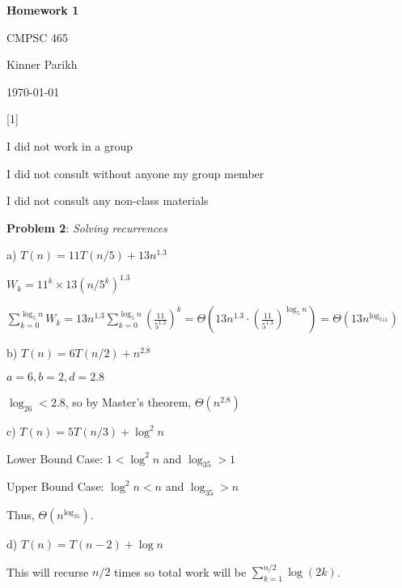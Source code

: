 \documentclass{article} %
\newcommand{\question}[2][]{\begin{flushleft}
        \textbf{Problem #1}: \textit{#2}

\end{flushleft}}
\newcommand{\maketitletwo}[2][]{\begin{center}
        \Large{\textbf{Homework #1}
            
            CMPSC 465} %
        \vspace{5pt}
        
        \normalsize{Kinner Parikh  %
        
        \today}        %
        \vspace{40pt}


        \newpage
        
\end{center}}
\begin{document}
    \maketitletwo[1]  %

    \question[1]{}
    \begin{center}
        
        I did not work in a group
    
        I did not consult without anyone my group member
    
        I did not consult any non-class materials
    \end{center}
    
    \newpage

    \question[2]{Solving recurrences}

    a) $T(n) = 11T(n / 5) + 13n^{1.3}$



    $W_k = 11^k \times 13(n/5^k)^{1.3}$

    $\sum_{k = 0}^{\log_5n} W_k = 13n^{1.3} \sum_{k = 0}^{\log_5n} \left(\frac{11}{5^{1.3}}\right)^k = \Theta(13n^{1.3} \cdot \left(\frac{11}{5^{1.3}}\right)^{\log_5n}) = \boxed{\Theta(13n^{\log_511})}$

    \vspace{5pt}

    b) $T(n) = 6T(n / 2) + n^{2.8}$

    $ a = 6, b = 2, d = 2.8$

    $\log_26 < 2.8$, so by Master's theorem, $\boxed{\Theta(n^{2.8})}$

    \vspace{5pt}

    c) $T(n) = 5T(n / 3) + \log^2n$



    Lower Bound Case: $1 < \log^2n$ and $\log_35 > 1$

    Upper Bound Case: $\log^2n < n$ and $\log_35 > n$

    Thus, $\boxed{\Theta(n^{\log_35})}$.

    \vspace{5pt}

    d) $T(n) = T(n - 2) + \log n$

    This will recurse $n/2$ times so total work will be $\sum_{k = 1}^{n/2}\log(2k)$.
\end{document}
